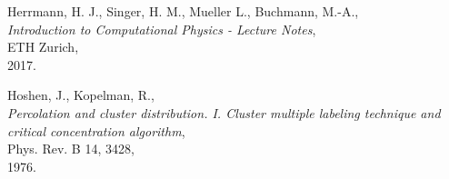 \documentclass[11pt,a4paper]{article}
\begin{document}
\begin{thebibliography}{99}

	Herrmann, H. J.,
	Singer, H. M.,
	Mueller L.,
	Buchmann, M.-A.,\\
	\emph{Introduction to Computational Physics - Lecture Notes},\\
	ETH Zurich,\\
	2017.
	
	Hoshen, J.,
	Kopelman, R.,\\
	\emph{Percolation and cluster distribution. I. Cluster multiple labeling technique and critical concentration algorithm},\\
	Phys. Rev. B 14, 3428,\\
	1976.

\end{thebibliography}
\end{document}
